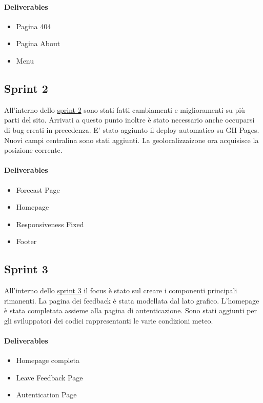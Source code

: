 \paragraph{Deliverables} 
\begin{itemize}
    \item Pagina 404
    \item Pagina About
    \item Menu
\end{itemize}

\subsection{Sprint 2}
All'interno dello  \href{https://github.com/orgs/Weather-Vortex/projects/4}{sprint 2} sono stati fatti cambiamenti e miglioramenti su più parti del sito. Arrivati a questo punto inoltre è stato necessario anche occuparsi di bug creati in precedenza. E' stato aggiunto il deploy automatico su GH Pages. Nuovi campi centralina sono stati aggiunti. La geolocalizzaizone ora acquisisce la posizione corrente. 
\paragraph{Deliverables} 
\begin{itemize}
    \item Forecast Page
    \item Homepage
    \item Responsiveness Fixed
    \item Footer
\end{itemize}

\subsection{Sprint 3}
All'interno dello  \href{https://github.com/orgs/Weather-Vortex/projects/5}{sprint 3} il focus è stato sul creare i componenti principali rimanenti. La pagina dei feedback è stata modellata dal lato grafico. L'homepage è stata completata assieme alla pagina di autenticazione. Sono stati aggiunti per gli sviluppatori dei codici rappresentanti le varie condizioni meteo. 
\paragraph{Deliverables} 
\begin{itemize}
    \item Homepage completa
    \item Leave Feedback Page
    \item Autentication Page
\end{itemize}

